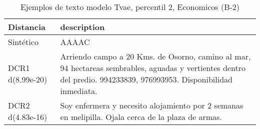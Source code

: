 \begin{table}[H]
\centering
\fontsize{10}{14}\selectfont
\caption{Ejemplos de texto modelo Tvae, percentil 2, Economicos (B-2)}
\label{table-example-economicos-b-2-tvae-2p-text}
\begin{tabular}{|l|m{35em}|}
\hline
\rowcolor[gray]{0.8}
Distancia & description \\
\hline Sintético & AAAAC \\
\hline DCR1 d(8.99e-20) & Arriendo campo a 20 Kms. de Osorno, camino al mar, 94 hectareas sembrables, aguadas y vertientes dentro del predio. 994233839, 976993953. Disponibilidad inmediata. \\
\hline DCR2 d(4.83e-16) & Soy enfermera y necesito alojamiento por 2 semanas en melipilla. Ojala cerca de la plaza de armas. \\
\hline
\end{tabular}
\end{table}
